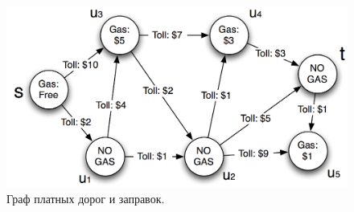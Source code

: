 \documentclass[12pt,answers]{exam}
\begin{document}
\begin{questions}
\nomorequestions

\begin{figure}[!ht]
  \label{fig:roads}
  \includegraphics[width=15cm]{roads.png}
  \caption{Граф платных дорог и заправок.}
\end{figure}

\end{questions}
\end{document}
